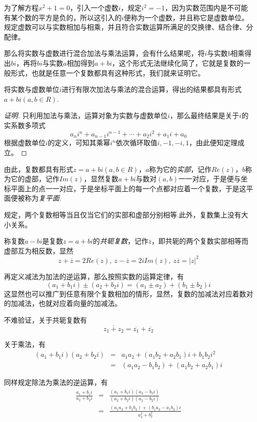 为了解方程$x^2+1=0$，引入一个虚数$i$，规定$i^2=-1$，因为实数范围内是不可能有某个数的平方是负的，所以这引入的$i$便称为一个虚数，并且称它是虚数单位。规定虚数可以与实数相加与相乘，并且符合实数运算所满足的交换律、结合律、分配律。

那么将实数与虚数进行混合加法与乘法运算，会有什么结果呢，将$i$与实数$b$相乘得出$bi$，再将$bi$与实数$a$相加得到$a+bi$，这个形式无法继续化简了，它就是复数的一般形式，也就是任意一个复数都具有这种形式，我们就来证明它。

\begin{theorem}
  将实数与虚数单位$i$进行有限次加法与乘法的混合运算，得出的结果都具有形式$a+bi(a,b\in R)$.
\end{theorem}

\begin{proof}[证明]
  只利用加法与乘法，运算对象为实数与虚数单位$i$，那么最终结果是关于$i$的实系数多项式
  \[ a_ni^n+a_{n-1}i^{n-1} + \cdots + a_2i^2 + a_1i+a_0 \]
  根据虚数单位$i$的定义，可知其乘幂$i^n$依次循环取值$i,-1,-i,1$，由此便知定理成立。
\end{proof}

由此，复数都具有形式$z=a+bi(a,b\in R)$，$a$称为它的\emph{实部}，记作$Re(z)$，$b$称为它的虚部，记作$Im(z)$，显然复数$a+bi$与数对$(a,b)$一一对应，于是便与坐标平面上的点一一对应，于是坐标平面上的每一个点都对应着一个复数，于是这平面便被称为\emph{复平面}.

规定，两个复数相等当且仅当它们的实部和虚部分别相等.此外，复数集上没有大小关系。

称复数$a-bi$是复数$z=a+bi$的\emph{共轭复数}，记作$\overline{z}$，即共轭的两个复数实部相等而虚部互为相反数，显然
\[ z+\overline{z}=2Re(z), \  z-\overline{z}=2iIm(z), \  z\overline{z}=|z|^2 \]

再定义减法为加法的逆运算，那么按照实数的运算定律，有
\[ (a_1+b_1i) \pm (a_2+b_2i) = (a_1 \pm a_2) + (b_1 \pm b_2)i \]
这显然也可以推广到任意有限个复数相加的情形，显然，复数的加减法对应着数对的加减法，也就对应着向量的加减法。

不难验证，关于共轭复数有
\[ \overline{z_1+z_2}=\overline{z_1}+\overline{z_2} \]

关于乘法，有
\begin{eqnarray*}
  (a_1+b_1i)(a_2+b_2i) & = & a_1a_2+(a_1b_2+a_2b_1)i + b_1b_2 i^2 \\
  & = & (a_1a_2-b_1b_2) + (a_1b_2+a_2b_1)i
\end{eqnarray*}

同样规定除法为乘法的逆运算，有
\begin{eqnarray*}
  \frac{a_1+b_1i}{a_2+b_2i} & = & \frac{(a_1+b_1i)(a_2-b_2i)}{(a_2+b_2i)(a_2-b_2i)} \\
  & = & \frac{(a_1a_2+b_1b_2)+(b_1a_2-a_1b_2)i}{a_2^2+b_2^2}
\end{eqnarray*}

